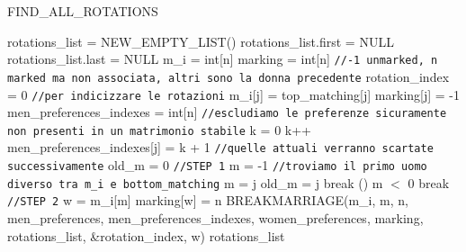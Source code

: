\documentclass[12pt]{article}
\begin{document}
    \begin{algorithm}[H]
        \scriptsize
        \DontPrintSemicolon
        \caption{FIND\_ALL\_ROTATIONS}\label{alg:FindAllRotations}
        \;
        rotations\_list = NEW\_EMPTY\_LIST()\;
        rotations\_list.first = NULL\;
	rotations\_list.last = NULL\;
        m\_i = int[n]\;
        \;
        marking = int[n] \texttt{//-1 unmarked, n marked ma non associata, altri sono la donna precedente}\;
        rotation\_index = 0 \texttt{//per indicizzare le rotazioni}\;
        \;
         {
		m\_i[j] = top\_matching[j]\;
            marking[j] = -1\;
	}
        men\_preferences\_indexes = int[n]\;
        \;
        \texttt{//escludiamo le preferenze sicuramente non presenti in un matrimonio stabile}\;
	 {
		k = 0\;
		 {
			k++\;
            }
		men\_preferences\_indexes[j] = k + 1 \texttt{//quelle attuali verranno scartate successivamente}\;
	}
        \;
        old\_m = 0\;
         {
            \texttt{//STEP 1}\;
            m = -1\;
            \texttt{//troviamo il primo uomo diverso tra m\_i e bottom\_matching}\;
             {
                 {
                     m = j\;
                     old\_m = j\;
                     break\;
                }
            }
            \;
            \If() {m $<$ 0} {
                break\;
            }
            \;
            \texttt{//STEP 2}\;
            w = m\_i[m]\;
            marking[w] = n\;
            BREAKMARRIAGE(m\_i, m, n, men\_preferences, men\_preferences\_indexes, women\_preferences, marking, rotations\_list, \&rotation\_index, w)\;
        }
        \;
        \Return rotations\_list\;
    \end{algorithm}
\end{document}
